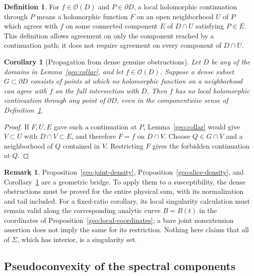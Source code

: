 \documentclass[11pt]{article}
\numberwithin{equation}{section}
\newtheorem{corollary}[theorem]{Corollary}
\theoremstyle{definition}
\newtheorem{definition}[theorem]{Definition}
\newtheorem{remark}[theorem]{Remark}
\begin{document}
\begin{definition}\label{geo:componentwise-extension}
For \(f\in\mathcal O(D)\) and \(P\in\partial D\), a local
holomorphic continuation through \(P\) means a
holomorphic function \(F\) on an open neighborhood \(U\)
of \(P\) which agrees with \(f\) on some connected
component \(E\) of \(D\cap U\) satisfying
\(P\in\overline E\).
This definition allows agreement on only the component
reached by a continuation path; it does not require
agreement on every component of \(D\cap U\).
\end{definition}

\begin{corollary}[Propagation from dense genuine obstructions]
\label{geo:propagate-obstruction}
Let \(D\) be any of the domains in
Lemma~\ref{geo:collar}, and let \(f\in\mathcal O(D)\).
Suppose a dense subset \(G\subset\partial D\) consists
of points at which no holomorphic function on a
neighborhood can agree with \(f\) on the full
intersection with \(D\).  Then \(f\) has no local
holomorphic continuation through any point of
\(\partial D\), even in the componentwise sense of
Definition~\ref{geo:componentwise-extension}.
\end{corollary}

\begin{proof}
If \(F,U,E\) gave such a continuation at \(P\),
Lemma~\ref{geo:collar} would give \(V\subset U\)
with \(D\cap V\subset E\), and therefore \(F=f\)
on \(D\cap V\).  Choose \(Q\in G\cap V\) and a
neighborhood of \(Q\) contained in \(V\).  Restricting
\(F\) gives the forbidden continuation at \(Q\).
\end{proof}

\begin{remark}\label{geo:scope-nonextension}
Proposition~\ref{geo:joint-density},
Proposition~\ref{geo:slice-density}, and
Corollary~\ref{geo:propagate-obstruction} are a geometric
bridge.  To apply them to a susceptibility, the dense
obstructions must be proved for the entire physical sum,
with its normalization and tail included.
For a fixed-ratio corollary, its local singularity
calculation must remain valid along the corresponding
analytic curve \(B=B(t)\) in the coordinates of
Proposition~\ref{geo:local-coordinates}; a bare joint
nonextension assertion does not imply the same for
its restriction.  Nothing here claims that all of
\(\Sigma\), which has interior, is a singularity set.
\end{remark}

\subsection{Pseudoconvexity of the spectral components}
\label{geo:psh-section}
\end{document}
